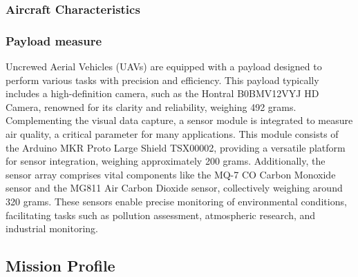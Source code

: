 \documentclass[12 pt]{article}
\begin{document}
\subsubsection{Aircraft Characteristics}
\begin{table}[h]
\centering
{}
\caption{Initial Mission Requirements}
\label{Mission Requirements}
\end{table}

\subsubsection{Payload measure}
Uncrewed Aerial Vehicles (UAVs) are equipped with a payload designed to perform various tasks with precision and efficiency. This payload typically includes a high-definition camera, such as the Hontral B0BMV12VYJ HD Camera, renowned for its clarity and reliability, weighing 492 grams. Complementing the visual data capture, a sensor module is integrated to measure air quality, a critical parameter for many applications. This module consists of the Arduino MKR Proto Large Shield TSX00002, providing a versatile platform for sensor integration, weighing approximately 200 grams. Additionally, the sensor array comprises vital components like the MQ-7 CO Carbon Monoxide sensor and the MG811 Air Carbon Dioxide sensor, collectively weighing around 320 grams. These sensors enable precise monitoring of environmental conditions, facilitating tasks such as pollution assessment, atmospheric research, and industrial monitoring.

\subsection{Mission Profile}
\end{document}
